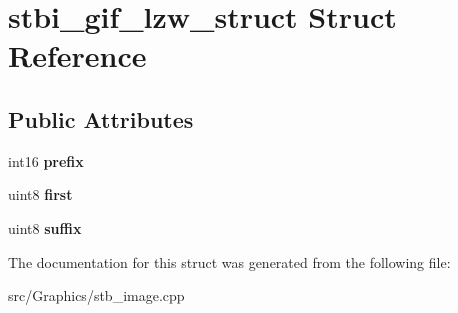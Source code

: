 \hypertarget{structstbi__gif__lzw__struct}{\section{stbi\+\_\+gif\+\_\+lzw\+\_\+struct Struct Reference}
\label{structstbi__gif__lzw__struct}
}
\subsection*{Public Attributes}
\begin{DoxyCompactItemize}
\item 
\hypertarget{structstbi__gif__lzw__struct_a0e5142cb4117b905eb9efd73c436525c}{int16 {\bfseries prefix}}\label{structstbi__gif__lzw__struct_a0e5142cb4117b905eb9efd73c436525c}

\item 
\hypertarget{structstbi__gif__lzw__struct_a08129c445d56c0983285d6e0e71b83bd}{uint8 {\bfseries first}}\label{structstbi__gif__lzw__struct_a08129c445d56c0983285d6e0e71b83bd}

\item 
\hypertarget{structstbi__gif__lzw__struct_a3ec7f462268018489345b79b2f123764}{uint8 {\bfseries suffix}}\label{structstbi__gif__lzw__struct_a3ec7f462268018489345b79b2f123764}

\end{DoxyCompactItemize}


The documentation for this struct was generated from the following file\+:\begin{DoxyCompactItemize}
\item 
src/\+Graphics/stb\+\_\+image.\+cpp\end{DoxyCompactItemize}
